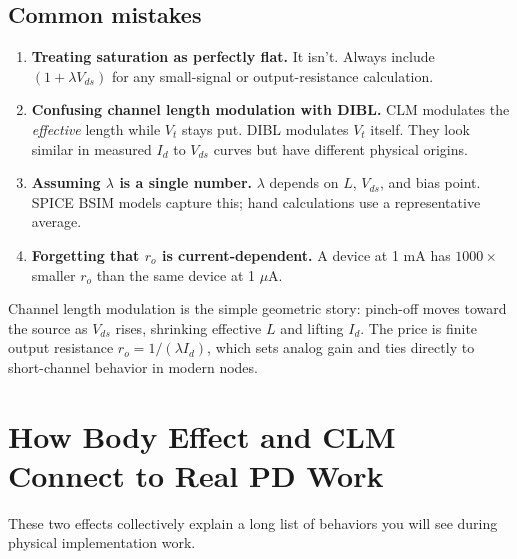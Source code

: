 \documentclass[11pt]{article}
\begin{document}
\subsection{Common mistakes}

\begin{enumerate}
\item \textbf{Treating saturation as perfectly flat.} It isn't. Always include $(1 + \lambda V_{ds})$ for any small-signal or output-resistance calculation.
\item \textbf{Confusing channel length modulation with DIBL.} CLM modulates the \emph{effective} length while $V_t$ stays put. DIBL modulates $V_t$ itself. They look similar in measured $I_d$ to $V_{ds}$ curves but have different physical origins.
\item \textbf{Assuming $\lambda$ is a single number.} $\lambda$ depends on $L$, $V_{ds}$, and bias point. SPICE BSIM models capture this; hand calculations use a representative average.
\item \textbf{Forgetting that $r_o$ is current-dependent.} A device at 1 mA has $1000\times$ smaller $r_o$ than the same device at 1 $\mu$A.
\end{enumerate}

\begin{checkpoint}
Channel length modulation is the simple geometric story: pinch-off moves toward the source as $V_{ds}$ rises, shrinking effective $L$ and lifting $I_d$. The price is finite output resistance $r_o = 1/(\lambda I_d)$, which sets analog gain and ties directly to short-channel behavior in modern nodes.
\end{checkpoint}

\section{How Body Effect and CLM Connect to Real PD Work}

These two effects collectively explain a long list of behaviors you will see during physical implementation work.
\end{document}
